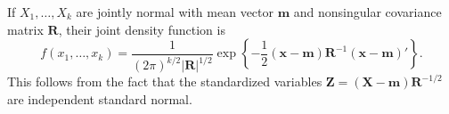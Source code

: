 If $X_1, \ldots, X_k$ are jointly normal with mean vector $\mathbf{m}$ and nonsingular covariance matrix $\mathbf{R}$, their joint density function is
$$f(x_1, \ldots, x_k) = \frac{1}{(2\pi)^{k/2} |\mathbf{R}|^{1/2}} \exp\left\{-\frac{1}{2} (\mathbf{x} - \mathbf{m}) \mathbf{R}^{-1} (\mathbf{x} - \mathbf{m})'\right\}.$$
This follows from the fact that the standardized variables $\mathbf{Z} = (\mathbf{X} - \mathbf{m})\mathbf{R}^{-1/2}$ are independent standard normal.
